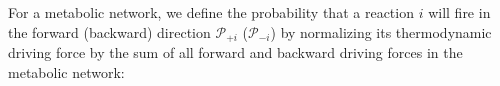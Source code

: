 For a metabolic network, we define the probability that a reaction $i$ will fire in the forward (backward)  direction ${\mathcal P_{+i}}$ ($\mathcal P_{-i}$) by normalizing its thermodynamic driving force by the sum of all forward and backward driving forces in the metabolic network: